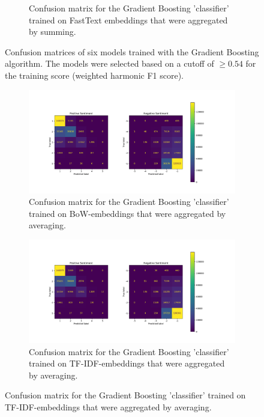 \begin{figure}
\begin{subfigure}[b]{0.475\textwidth}
        \caption{Confusion matrix for the Gradient Boosting 'classifier' trained on FastText embeddings that were aggregated by summing.}    
        \label{fig:grad_boost_sum_ft}
    \end{subfigure}
    \caption{Confusion matrices of six models trained with the Gradient Boosting algorithm. The models were selected based on a cutoff of $\ge 0.54$ for the training score (weighted harmonic F1 score).} 
    \label{fig:confusion_gensim}
\end{figure}


\begin{figure}
    \centering
    \begin{subfigure}[b]{0.475\textwidth}
        \centering
        \includegraphics[width=\textwidth]{images/grad_boost_av_bow.pdf}
        \caption{Confusion matrix for the Gradient Boosting 'classifier' trained on BoW-embeddings that were aggregated by averaging.}    
        \label{fig:grad_boost_av_bow}
    \end{subfigure}
    \hfill
    \begin{subfigure}[b]{0.475\textwidth}
        \centering
        \includegraphics[width=\textwidth]{images/grad_boost_av_tfidf.pdf}
        \caption{Confusion matrix for the Gradient Boosting 'classifier' trained on TF-IDF-embeddings that were aggregated by averaging.}    

\end{subfigure}
\end{figure}
